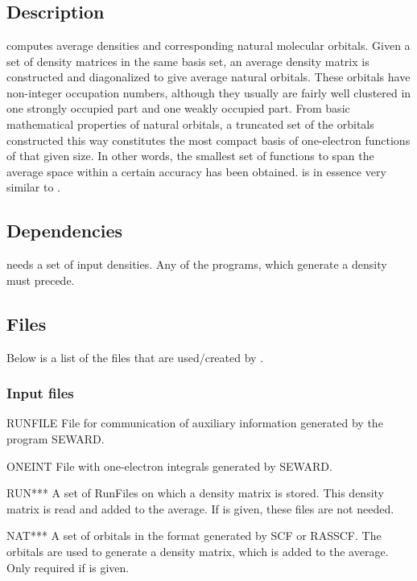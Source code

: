 \section{}
\label{UG:sec:averd}

\subsection{Description}
\label{UG:sec:averd_description}
 computes average densities and corresponding
natural molecular orbitals. Given a set of density
matrices in the same basis set, an average density matrix is
constructed and diagonalized to give average natural orbitals.
These orbitals have non-integer occupation numbers, although they
usually are fairly well clustered in one strongly occupied
part and one weakly occupied part. From basic mathematical
properties of natural orbitals, a truncated set of the orbitals
constructed this way constitutes the most compact basis of
one-electron functions of that given size. In other words, the smallest
set of functions to span the average space within a certain
accuracy has been obtained. 
is in essence very similar to .

\subsection{Dependencies}
\label{UG:sec:averd_dependencies}
 needs a set of input densities. Any of the
programs, which  generate a density must precede.

\subsection{Files}
\label{UG:sec:averd_files}
Below is a list of the files that are used/created by
.

\subsubsection{Input files}
\begin{filelist}
\item[RUNFILE]
File for communication of auxiliary information generated by the program
{\prgmfont SEWARD}.
\item[ONEINT]
File with one-electron integrals generated by {\prgmfont SEWARD}.
\item[RUN***]
A set of RunFiles on which a density matrix is stored. This density
matrix is read and added to the average. If  is
given, these files are not needed.
\item[NAT***]
A set of orbitals in the format generated by {\prgmfont SCF} or
{\prgmfont RASSCF}. The orbitals are used to generate a density matrix,
which is added to the average. Only required if  is
given.
\end{filelist}

